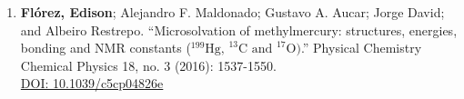 \begin{enumerate}[leftmargin=7mm]
    \item \textbf{Flórez, Edison}; Alejandro F. Maldonado; Gustavo A. Aucar; Jorge David; and Albeiro Restrepo. ``Microsolvation of methylmercury: structures, energies, bonding and NMR constants ($^{199}\text{Hg, }^{13}\text{C and }^{17}\text{O)}$.'' Physical Chemistry Chemical Physics 18, no. 3 (2016): 1537-1550.\\
          \href{https://www.doi.org/10.1039/c5cp04826e}{DOI: 10.1039/c5cp04826e}

\end{enumerate}


